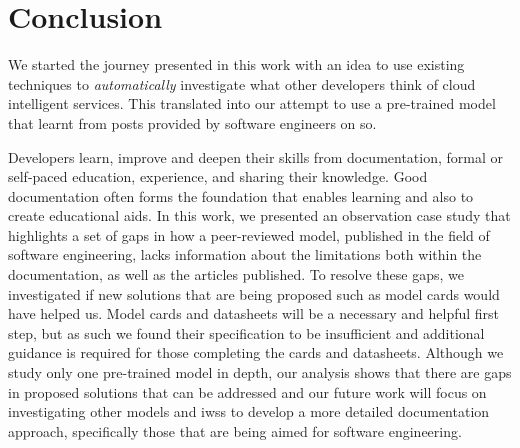 
\section{Conclusion}\label{caise2021:sec:conclusion}
We started the journey presented in this work with an idea to use existing  techniques to \textit{automatically} investigate what other developers think of cloud intelligent services. This translated into our attempt to use a  pre-trained model that learnt from posts provided by software engineers on \gls{so}.

Developers learn, improve and deepen their skills from documentation, formal or self-paced education, experience, and sharing their knowledge. Good documentation often forms the foundation that enables learning and also to create educational aids. In this work, we presented an observation case study that highlights a set of gaps in how a peer-reviewed model, published in the field of software engineering, lacks information about the limitations both within the documentation, as well as the articles published. To resolve these gaps, we investigated if new solutions that are being proposed such as model cards would have helped us. Model cards and datasheets will be a necessary and helpful first step, but as such we found their specification to be insufficient and additional guidance is required for those completing the cards and datasheets. Although we study only one pre-trained model in depth, our analysis shows that there are gaps in proposed solutions that can be addressed and our future work will focus on investigating other models and \glspl{iws} to develop a more detailed documentation approach, specifically those that are being aimed for software engineering. 